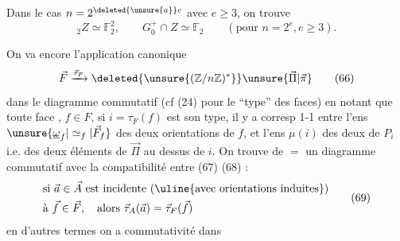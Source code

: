 Dans le cas $n=2^{\deleted{\unsure{a}}e}$ avec $e\ge3$, on trouve 
\[
 {}_2Z\simeq\mathbb F_2^2,\qquad G_0^+\cap Z\simeq\mathbb F_2
 \qquad(\text{pour }n=2^e,e\ge3).
\tag*{(65)}
\]

On va encore  l'application canonique
\[
\vec F\xrightarrow{\vec\tau_F}\deleted{\unsure{(\mathbb Z/n\mathbb Z)^*}}\unsure{\vec\Pi|\vec\pi}
\tag*{(66)}
\]
 dans le diagramme commutatif 
(cf (24) pour le ``type'' des faces)
en notant que toute face  , $f\in F$, si $i=\tau_F(f)$ est son type, il y a corresp 1-1 entre l'ens $\unsure{\underline\omega_f|\simeq_f|\vec F_f}$ des deux orientations de $f$, et l'ens $\mu(i)$ des deux  de $P_i$ i.e. des deux éléments de $\vec\Pi$ au dessus de $i$. On trouve de $=$ un diagramme commutatif 
avec la compatibilité entre (67) (68) :
\[
\begin{aligned}
&\text{si }\vec a\in\vec A\text{ est incidente (\uline{avec orientations induites})}\\
&\text{à }\vec f\in\vec F,\quad\text{alors }\vec\tau_A(\vec a)=\vec\tau_F(\vec f)
\end{aligned}\tag*{(69)}
\]
en d'autres termes on a commutativité dans

